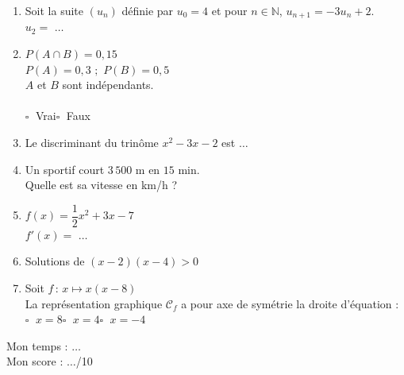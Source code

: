 \documentclass[a4paper,11pt,landscape,exos]{nsi} %
\begin{document}
\begin{multicols}{2}
\begin{enumerate}[itemsep=1em]
\begin{tikzpicture}[baseline,scale = 0.6]
\end{tikzpicture}\\
	\item Soit la suite $(u_n)$ définie  par $u_0 = 4$ et pour $n \in \mathbb{N}$, 
    $u_{n+1} = -3u_n +2$.\\
    $u_2=$ $\ldots$
	\item $P(A\cap B)=0{,}15$\\$P(A)=0{,}3\,\,;\,\,P(B)=0{,}5$\\$A$ et $B$ sont indépendants.\\\\	$\square\;$ Vrai\qquad $\square\;$ Faux\qquad 
	\item Le discriminant du trinôme $x^2-3x-2$ est  $\ldots$
	\item Un sportif court $3\,500$ m  en $15$ min.\\
      Quelle est sa vitesse en km/h ?
	\item $f(x)=\dfrac{1}{2}x^2+3x-7$\\
    $f'(x)=$ $\ldots$
	
	\item Solutions de $(x-2)(x-4)  > 0$\\
	\item Soit $f\,:\,x\longmapsto x(x-8) $\\
    La représentation graphique $\mathcal{C}_f$ a pour axe de symétrie la droite d’équation :\\	$\square\;$ $x=8$\qquad $\square\;$ $x=4$\qquad $\square\;$ $x=-4$\qquad 
	
\end{enumerate}
\vfill\null
\columnbreak
Mon temps : $\ldots$\\[.5em]
Mon score : $\ldots$/10
\end{multicols}
\newpage
\end{document}
